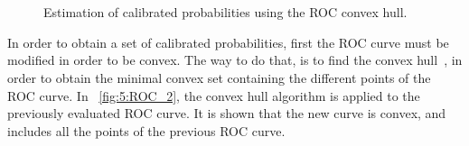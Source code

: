 \begin{figure}[!t]
\hskip 0.5cm
\hbox{
  \hskip 0.5cm
}
\vskip 1.5cm

\hbox{ 
  \hskip 1cm
}
\caption{Estimation of calibrated probabilities using the ROC convex hull.}\label{fig:5:rocch}
\end{figure}

In order to obtain a set of calibrated probabilities, first the ROC curve must be modified in 
order to be convex. The way to do that, is to find the convex \mbox{hull 
\citep{Hernandez-Orallo2012}}, in order to obtain the minimal convex set containing the different 
points of the ROC curve. In \figurename{~\ref{fig:5:ROC_2}}, the convex hull algorithm is applied 
to the previously evaluated ROC curve. It is shown that the new curve is convex, and includes all 
the points of the previous ROC curve.

